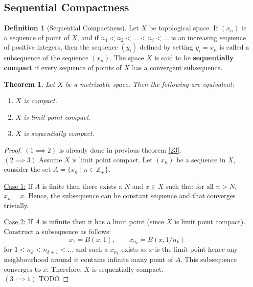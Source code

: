 \documentclass[12pt,reqno]{amsart}
\theoremstyle{plain}
\newtheorem{thm}{Theorem}
\theoremstyle{definition}
\newtheorem{defn}{Definition}
\newcommand{\bb}[1]{\mathbb{#1}}
\begin{document}
\subsection{Sequential Compactness}
\begin{defn}[Sequential Compactness]
    Let $X$ be topological space. If $(x_n)$ is a sequence of point of $X$, and if $n_1 < n_2 < \dots < n_i < \dots $ is an increasing sequence of positive integers, then the sequence $(y_i)$ defined by setting $y_i = x_n$ is called a subsequence of the sequence $(x_n)$. The space $X$ is said to be {\bf sequentially compact} if every sequence of points of $X$ has a convergent subsequence.
\end{defn}
\begin{thm}
    Let $X$ be a metrizable space. Then the following are equivalent:
    \begin{enumerate}
        \item $X$ is compact.
        \item $X$ is limit point compact.
        \item $X$ is sequentially compact.
    \end{enumerate}
\end{thm}
\begin{proof}
    $(1 \implies 2)$ is already done in previous theorem \ref{23}. \\
    $(2 \implies 3)$ Assume $X$ is limit point compact. Let $(x_n)$ be a sequence in $X$, consider the set $A = \{x_n \mid n \in \bb Z_+\}$. 
    
    \noindent \underline{Case 1:} If $A$ is finite then there exists a $N$ and $x \in X$ such that for all $n > N$, $x_n = x$. Hence, the subsequence can be constant sequence and that converges trivially.

    \noindent \underline{Case 2:} If $A$ is infinite then it has a limit point (since $X$ is limit point compact). Construct a subsequence as follows: 
    $$ x_1 = B(x,1), \qquad x_{n_k} = B(x,1/n_k)$$
    for $1 < n_k < n_{k+1} < \dots$ and such a $x_{n_k}$ exists as $x$ is the limit point hence any neighbourhood around it contains infinite many point of $A$. This subsequence converges to $x$. Therefore, $X$ is sequentially compact. \\
    $(3 \implies 1)$ TODO
\end{proof}
\end{document}
